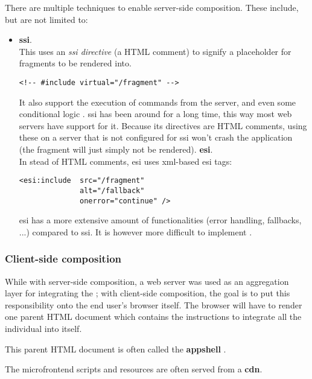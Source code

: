 There are multiple techniques to enable server-side composition. These include,
but are not limited to:
\begin{itemize}
  \item \textbf{\gls{ssi}}.\\
  This uses an \textit{\gls{ssi} directive} (a HTML comment) to signify a
  placeholder for fragments to be rendered into.
  \begin{verbatim}
<!-- #include virtual="/fragment" -->
  \end{verbatim}
  It also support the execution of commands from the server, and even some
  conditional logic \autocite{Apache_2013}. \gls{ssi} has been around for a long
  time, this way most web servers have support for it. Because its directives
  are HTML comments, using these on a server that is not configured for
  \gls{ssi} won't crash the application (the fragment will just simply not be
  rendered).
  \spacedItem  \textbf{\gls{esi}}.\\
  In stead of HTML comments, \gls{esi} uses \gls{xml}-based \gls{esi} tags:
  \begin{verbatim}
<esi:include  src="/fragment" 
              alt="/fallback" 
              onerror="continue" />
  \end{verbatim}
  \gls{esi} has a more extensive amount of functionalities (error handling,
  fallbacks, ...) compared to \gls{ssi}. It is however more difficult to
  implement \autocite{Rappl_2021}.
\end{itemize}


\subsubsection{Client-side composition}

While with server-side composition, a web server was used as an aggregation
layer for integrating the ; with client-side
composition, the goal is to put this responsibility onto the end user's browser
itself. The browser will have to render one parent HTML document which contains
the instructions to integrate all the individual  into
itself.

This parent HTML document is often called the \textbf{\gls{appshell}}
\autocite{Geers_2020}\autocite{Rappl_2021}. 

The \gls{microfrontend} scripts and resources are often served from a
\textbf{\gls{cdn}}.


